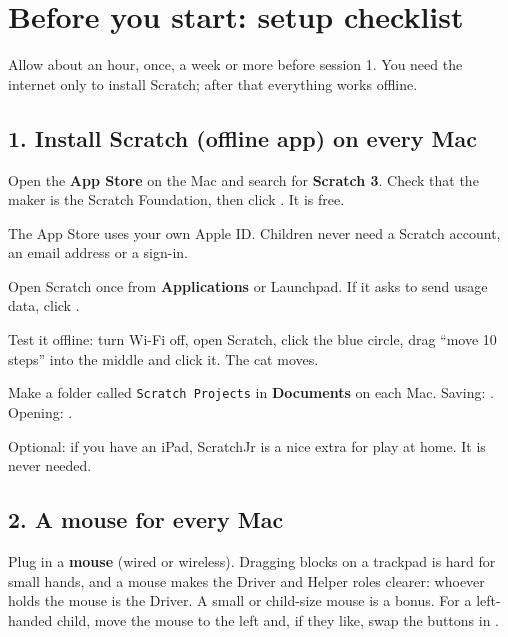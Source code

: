 \documentclass[track=junior,level=1,teacher]{kidscode}
\begin{document}
\section{Before you start: setup checklist}
Allow about an hour, once, a week or more before session 1. You need the internet only to install
Scratch; after that everything works offline.

\subsection{1. Install Scratch (offline app) on every Mac}
\begin{checklist}
  \item Open the \textbf{App Store} on the Mac and search for \textbf{Scratch 3}. Check that the
        maker is the Scratch Foundation, then click . It is free.
  \item The App Store uses your own Apple ID. Children never need a Scratch account, an email address or a sign-in.
  \item Open Scratch once from \textbf{Applications} or Launchpad. If it asks to send usage data, click .
  \item Test it offline: turn Wi-Fi off, open Scratch, click the blue  circle, drag
        \enquote{move 10 steps} into the middle and click it. The cat moves.
  \item Make a folder called \texttt{Scratch Projects} in \textbf{Documents} on each Mac. Saving:
        . Opening: .
  \item Optional: if you have an iPad, ScratchJr is a nice extra for play at home. It is never needed.
\end{checklist}

\subsection{2. A mouse for every Mac}
Plug in a \textbf{mouse} (wired or wireless). Dragging blocks on a trackpad is hard for small hands,
and a mouse makes the Driver and Helper roles clearer: whoever holds the mouse is the Driver.
A small or child-size mouse is a bonus. For a left-handed child, move the mouse to the left and,
if they like, swap the buttons in .
\end{document}
